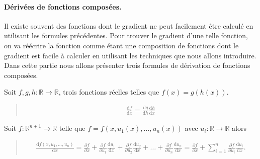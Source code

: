 \documentclass[letterpaper,11pt,english]{sphinxmanual}
\begin{document}
\paragraph{Dérivées de fonctions composées.}
\label{\detokenize{chapter2:derivees-de-fonctions-composees}}
\begin{DUlineblock}{0em}
\item[] Il existe souvent des fonctions dont le gradient ne peut facilement
être calculé en utilisant les formules précédentes. Pour trouver le
gradient d’une telle fonction, on va réécrire la fonction comme étant
une composition de fonctions dont le gradient est facile à calculer en
utilisant les techniques que nous allons introduire. Dans cette partie
nous allons présenter trois formules de dérivation de fonctions
composées.
\item[] 
\item[] Soit \(f,g,h: \mathbb{R}\rightarrow\mathbb{R}\), trois fonctions
réelles telles que \(f(x) = g(h(x))\).
\end{DUlineblock}
\begin{quote}
\begin{equation}\label{equation:chapter2:chapter2:30}
\begin{split}\frac{\mathrm{d} f}{\mathrm{d} x} = \frac{\mathrm{d} g}{\mathrm{d} h}\frac{\mathrm{d} h}{\mathrm{d} x}\end{split}
\end{equation}
\sphinxAtStartPar
{}
\end{quote}

\begin{DUlineblock}{0em}
\item[] Soit \(f:\mathbb{R}^{n+1}\rightarrow\mathbb{R}\) telle que
\(f = f(x,u_1(x),\dots,u_n(x))\) avec
\(u_i:\mathbb{R}\rightarrow\mathbb{R}\) alors
\end{DUlineblock}
\begin{quote}
\begin{equation}\label{equation:chapter2:chapter2:31}
\begin{split}\frac{\mathrm{d} f\left(x, u_{1}, \ldots, u_{n}\right)}{\mathrm{d} x}=\frac{\partial f}{\partial x}+\frac{\partial f}{\partial u_{1}} \frac{\mathrm{d} u_{1}}{\mathrm{d} x}+\frac{\partial f}{\partial u_{2}} \frac{\mathrm{d} u_{2}}{\mathrm{d} x}+\ldots+\frac{\partial f}{\partial u_{n}} \frac{\mathrm{d} u_{n}}{\mathrm{d} x}=\frac{\partial f}{\partial x}+\sum_{i=1}^{n} \frac{\partial f}{\partial u_{i}} \frac{\mathrm{d} u_{i}}{\mathrm{d} x}.\end{split}
\end{equation}\end{quote}
\end{document}

